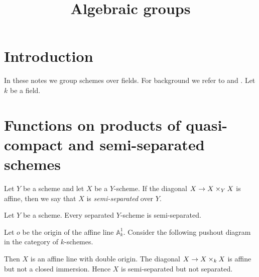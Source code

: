 



\title{Algebraic groups}
\date{}
\maketitle

\section{Introduction}
\noindent
In these notes we group schemes over fields. For background we refer to \cite{kfunctors} and \cite{Monoid_k_functors}. Let $k$ be a field.

\section{Functions on products of quasi-compact and semi-separated schemes}

\begin{definition}
Let $Y$ be a scheme and let $X$ be a $Y$-scheme. If the diagonal $X\rightarrow X\times_Y X$ is affine, then we say that $X$ is \textit{semi-separated} over $Y$.
\end{definition}

\begin{remark}\label{remark:separated_is_semi-separated}
Let $Y$ be a scheme. Every separated $Y$-scheme is semi-separated.
\end{remark}

\begin{example}
Let $o$ be the origin of the affine line $\mathbb{A}^1_k$. Consider the following pushout diagram in the category of $k$-schemes.
\begin{center}
\end{center}
Then $X$ is an affine line with double origin. The diagonal $X\rightarrow X\times_k X$ is affine but not a closed immersion. Hence $X$ is semi-separated but not separated.
\end{example}

